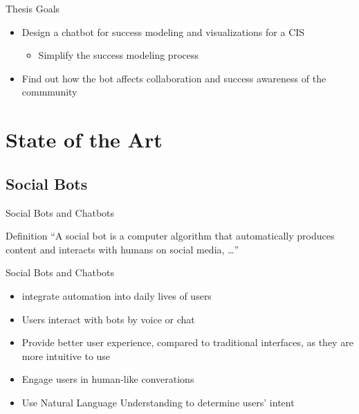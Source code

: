 \begin{frame}{Thesis Goals}
  \begin{itemize}
    \item Design a chatbot for success modeling and visualizations for a CIS
    \begin{itemize}
        \item Simplify the success modeling process
    \end{itemize}
    \item Find out how the bot affects collaboration and success awareness of the commmunity %
  \end{itemize}
\end{frame}







\section{State of the Art}

\subsection{Social Bots}
\begin{frame}{Social Bots and Chatbots}
  \begin{block}{Definition}
    ``A social bot is a computer algorithm that automatically produces content and interacts with humans on social media, \dots'' \cite{FVD*16b}
  \end{block}
\end{frame}

\begin{frame}{Social Bots and Chatbots}
  \begin{itemize}
    \item integrate automation into daily lives of users  %
    \item Users interact with bots by voice or chat %
    \item Provide better user experience, compared to traditional interfaces, as they are more intuitive to use
    \item Engage users in human-like converations 
    \item Use Natural Language Understanding to determine users' intent
\end{itemize}
\end{frame}


